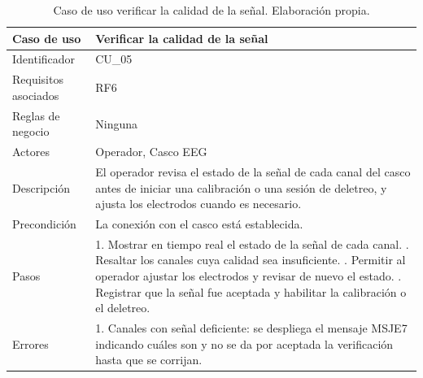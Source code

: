 \begin{table}[H]
\centering
\small
\begin{tabularx}{\textwidth}{|L{3.0cm}|Y|}
\hline
\textbf{Caso de uso} & \textbf{Verificar la calidad de la señal} \\
\hline
Identificador & CU\_05 \\
\hline
Requisitos asociados & RF6 \\
\hline
Reglas de negocio & Ninguna \\
\hline
Actores & Operador, Casco EEG \\
\hline
Descripción & El operador revisa el estado de la señal de cada canal del casco antes de iniciar una calibración o una sesión de deletreo, y ajusta los electrodos cuando es necesario. \\
\hline
Precondición & La conexión con el casco está establecida. \\
\hline
Pasos & 1. Mostrar en tiempo real el estado de la señal de cada canal. . Resaltar los canales cuya calidad sea insuficiente. . Permitir al operador ajustar los electrodos y revisar de nuevo el estado. . Registrar que la señal fue aceptada y habilitar la calibración o el deletreo. \\
\hline
Errores & 1. Canales con señal deficiente: se despliega el mensaje MSJE7 indicando cuáles son y no se da por aceptada la verificación hasta que se corrijan. \\
\hline
\end{tabularx}
\caption{Caso de uso verificar la calidad de la señal. Elaboración propia.}
\label{tab:cu05}
\end{table}

